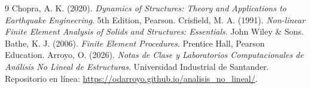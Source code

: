 \documentclass[11pt,letterpaper]{article}
\begin{document}
\begin{thebibliography}{9}
     Chopra, A. K. (2020). \textit{Dynamics of Structures: Theory and Applications to Earthquake Engineering}. 5th Edition, Pearson.
     Crisfield, M. A. (1991). \textit{Non-linear Finite Element Analysis of Solids and Structures: Essentials}. John Wiley \& Sons.
     Bathe, K. J. (2006). \textit{Finite Element Procedures}. Prentice Hall, Pearson Education.
     Arroyo, O. (2026). \textit{Notas de Clase y Laboratorios Computacionales de Análisis No Lineal de Estructuras}. Universidad Industrial de Santander. Repositorio en línea: \url{https://odarroyo.github.io/analisis_no_lineal/}.
\end{thebibliography}
\end{document}
